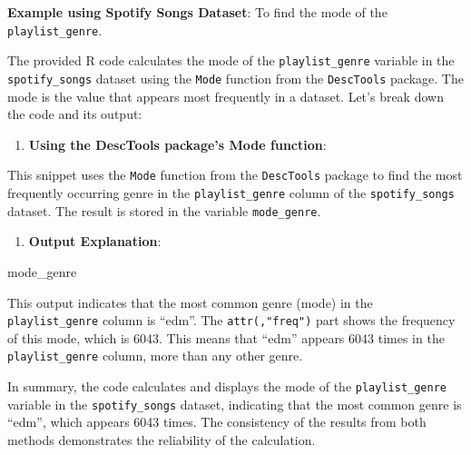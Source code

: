 \documentclass[
]{book}
\newenvironment{Shaded}{\begin{snugshade}}{\end{snugshade}}
\newcommand{\FunctionTok}[1]{\textcolor[rgb]{0.13,0.29,0.53}{\textbf{#1}}}
\newcommand{\NormalTok}[1]{#1}
\newcommand{\OtherTok}[1]{\textcolor[rgb]{0.56,0.35,0.01}{#1}}
\newcommand{\SpecialCharTok}[1]{\textcolor[rgb]{0.81,0.36,0.00}{\textbf{#1}}}
\providecommand{\tightlist}{%
  \setlength{\itemsep}{0pt}\setlength{\parskip}{0pt}}
\begin{document}
\textbf{Example using Spotify Songs Dataset}: To find the mode of the \texttt{playlist\_genre}.

The provided R code calculates the mode of the \texttt{playlist\_genre} variable in the \texttt{spotify\_songs} dataset using the \texttt{Mode} function from the \texttt{DescTools} package. The mode is the value that appears most frequently in a dataset. Let's break down the code and its output:

\begin{enumerate}
\def\labelenumi{\arabic{enumi}.}
\tightlist
\item
  \textbf{Using the DescTools package's Mode function}:
\end{enumerate}

\begin{Shaded}
\end{Shaded}

This snippet uses the \texttt{Mode} function from the \texttt{DescTools} package to find the most frequently occurring genre in the \texttt{playlist\_genre} column of the \texttt{spotify\_songs} dataset. The result is stored in the variable \texttt{mode\_genre}.

\begin{enumerate}
\def\labelenumi{\arabic{enumi}.}
\setcounter{enumi}{1}
\tightlist
\item
  \textbf{Output Explanation}:
\end{enumerate}

\begin{Shaded}
\begin{Highlighting}[]
\NormalTok{mode\_genre}
\end{Highlighting}
\end{Shaded}

This output indicates that the most common genre (mode) in the \texttt{playlist\_genre} column is ``edm''. The \texttt{attr(,"freq")} part shows the frequency of this mode, which is 6043. This means that ``edm'' appears 6043 times in the \texttt{playlist\_genre} column, more than any other genre.

In summary, the code calculates and displays the mode of the \texttt{playlist\_genre} variable in the \texttt{spotify\_songs} dataset, indicating that the most common genre is ``edm'', which appears 6043 times. The consistency of the results from both methods demonstrates the reliability of the calculation.
\end{document}
